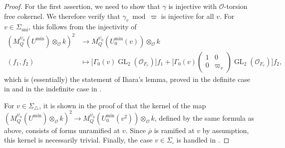 \documentclass[a4paper, notitlepage, 10pt]{amsart}
\theoremstyle{plain} %
\theoremstyle{definition} %
\theoremstyle{remark} %
\numberwithin{equation}{section}
\newcommand{\GL}{\operatorname{GL}} %
\newcommand{\uni}{\operatorname{uni}}
\begin{document}
    \begin{proof}
         For the first assertion, we need to show that $\gamma$ is injective with $\mathcal{O}$-torsion free cokernel. We therefore verify that $\gamma_v \bmod \varpi$ is injective for all $v$. For $v\in \Sigma_{\uni}$, this follows from the injectivity of 
         \begin{align*}
         (M_Q^{\psi_0}(U^{\min})\otimes_{\mathcal{O}} k)^2 &\longrightarrow M_Q^{\psi_0}(U^{\min}_0(v))\otimes_{\mathcal{O}} k
         \\ (f_1,f_2) &\mapsto \big[\Gamma_0(v) \GL_2(\mathcal{O}_{F_v})\big] f_1 +\Big[ \Gamma_0(v) \begin{pmatrix}
    1 & 0 \\ 0 & \varpi_v
\end{pmatrix} 
\GL_2(\mathcal{O}_{F_v})\Big] f_2,
         \end{align*}
         which is (essentially) the statement of Ihara's lemma, proved in the definite case in \cite[Proof of Lemma 3.1]{Tay06} and in the indefinite case in \cite{MS21}.
         
         For $v\in \Sigma_\triangle$, it is shown in the proof of \cite[Lemma 3.1]{Tay06} that the kernel of the map $(M_Q^{\psi_0}(U^{\min})\otimes_{\mathcal{O}} k)^2 \to M_Q^{\psi_0}(U^{\min}_0(v^2))\otimes_{\mathcal{O}} k$, defined by the same formula as above, consists of forms unramified at $v$. Since $\overline{\rho}$ is ramified at $v$ by assumption, this kernel is necessarily trivial. Finally, the case $v\in \Sigma_{\square}$ is handled in \cite[Lemma 3.1]{Tay06}.
         

\end{proof}
\end{document}
